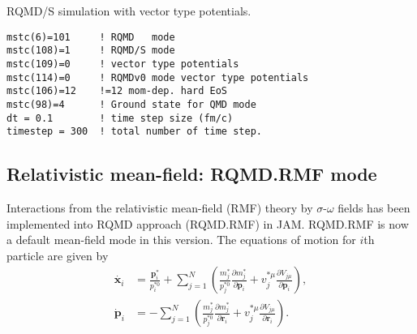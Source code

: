 \documentclass[]{article}
\begin{document}
RQMD/S simulation with vector type potentials.
\begin{verbatim}
mstc(6)=101     ! RQMD   mode
mstc(108)=1     ! RQMD/S mode
mstc(109)=0     ! vector type potentials
mstc(114)=0     ! RQMDv0 mode vector type potentials
mstc(106)=12    !=12 mom-dep. hard EoS
mstc(98)=4      ! Ground state for QMD mode
dt = 0.1        ! time step size (fm/c)
timestep = 300  ! total number of time step.

\end{verbatim}

\subsection{Relativistic mean-field: RQMD.RMF mode}

Interactions from the relativistic mean-field (RMF) theory 
by $\sigma$-$\omega$ fields has been implemented into RQMD
approach  (RQMD.RMF) in JAM. RQMD.RMF is now a default mean-field mode
in this version.
The equations of motion for $i$th particle are given by
\begin{align}
\dot{\bm{x}_i} & =
    \frac{\bm{p}_i^{*}}{p_i^{*0}}
                 +\sum_{j=1}^N\left(
                 \frac{m_j^*}{p_j^{*0}}
                 \frac{\partial m_j^*}{\partial\bm{p}_i}
                 +v^{*\mu}_j
                   \frac{\partial {V}_{j\mu}}{\partial\bm{p}_i}
                   \right), \nonumber\\
\dot{\bm{p}}_i
          &= -\sum_{j=1}^N\left(
                 \frac{m_j^*}{p_j^{*0}}
                 \frac{\partial m_j^*}{\partial\bm{r}_i}
                 +v^{*\mu}_j
                   \frac{\partial V_{j\mu}}{\partial\bm{r}_i}
                   \right).
\label{eq:eom}
\end{align}
\end{document}
